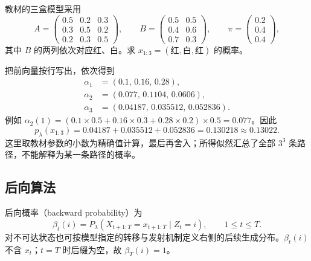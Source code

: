 \begin{example}
\label{ex:lh-hmm-three-boxes}
教材的三盒模型采用
\begin{equation}
\label{eq:lh-hmm-three-boxes}
 A=\begin{pmatrix}0.5&0.2&0.3\\0.3&0.5&0.2\\0.2&0.3&0.5\end{pmatrix},\qquad
 B=\begin{pmatrix}0.5&0.5\\0.4&0.6\\0.7&0.3\end{pmatrix},\qquad
 \pi=\begin{pmatrix}0.2\\0.4\\0.4\end{pmatrix},
\end{equation}
其中 $B$ 的两列依次对应红、白。求 $x_{1:3}=(\text{红},\text{白},\text{红})$ 的概率。
\end{example}
\begin{solve}
把前向量按行写出，依次得到
\[
 \begin{aligned}
 \alpha_1&=(0.1,\,0.16,\,0.28),\\
 \alpha_2&=(0.077,\,0.1104,\,0.0606),\\
 \alpha_3&=(0.04187,\,0.035512,\,0.052836).
 \end{aligned}
\]
例如 $\alpha_2(1)=(0.1\times0.5+0.16\times0.3+0.28\times0.2)\times0.5=0.077$。因此
\[
 p_\lambda(x_{1:3})=0.04187+0.035512+0.052836=0.130218\approx0.13022.
\]
这里取教材参数的小数为精确值计算，最后再舍入；所得似然汇总了全部 $3^3$ 条路径，不能解释为某一条路径的概率。
\end{solve}

\subsection{后向算法}

\begin{definition}
\label{def:lh-hmm-backward}
后向概率（backward probability）为
\begin{equation}
\label{eq:lh-hmm-beta-def}
 \beta_t(i)=P_\lambda(X_{t+1:T}=x_{t+1:T}\mid Z_t=i),\qquad1\leq t\leq T.
\end{equation}
对不可达状态也可按模型指定的转移与发射机制定义右侧的后续生成分布。$\beta_t(i)$ 不含 $x_t$；$t=T$ 时后缀为空，故 $\beta_T(i)=1$。
\end{definition}

